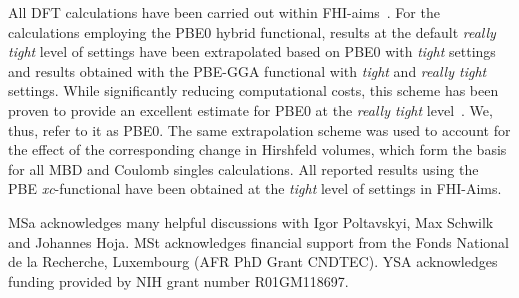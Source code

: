 \documentclass[aps,prl,groupaddress, twocolumn]{revtex4-1}  %
\begin{document}
All DFT calculations have been carried out within FHI-aims~\cite{fhi_aims}. For the calculations employing the PBE0 hybrid functional, results at the default \emph{really tight} level of settings have been extrapolated based on PBE0 with \emph{tight} settings and results obtained with the PBE-GGA functional with \emph{tight} and \emph{really tight} settings. While significantly reducing computational costs, this scheme has been proven to provide an excellent estimate for PBE0 at the \emph{really tight} level~\cite{Hoja2018}. We, thus, refer to it as PBE0. The same extrapolation scheme was used to account for the effect of the corresponding change in Hirshfeld volumes, which form the basis for all MBD and Coulomb singles calculations. All reported results using the PBE \textit{xc}-functional have been obtained at the \emph{tight} level of settings in FHI-Aims.

\begin{acknowledgements}
 MSa acknowledges many helpful discussions with Igor Poltavskyi, Max Schwilk and Johannes Hoja.
 MSt acknowledges financial support from the Fonds National de la Recherche, Luxembourg (AFR PhD Grant CNDTEC). 
 YSA acknowledges funding provided by NIH grant number R01GM118697.


\end{acknowledgements}


\end{document}
